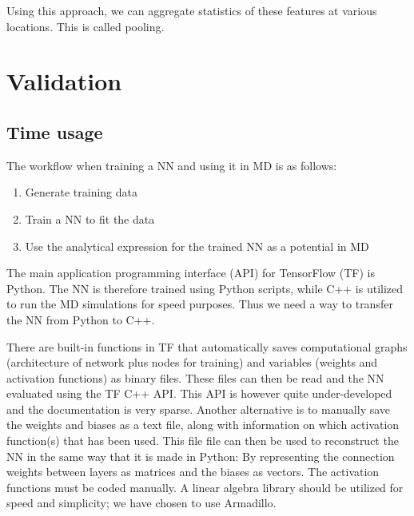\documentclass[twoside,english]{uiofysmaster}
\begin{document}
Using this approach, we can aggregate statistics of these features at various locations. This is called pooling. 

\chapter{Validation}

\section{Time usage} \label{sec:timeUsage}
The workflow when training a NN and using it in MD is as follows: 
\begin{enumerate}
 \item Generate training data
 \item Train a NN to fit the data
 \item Use the analytical expression for the trained NN as a potential in MD
\end{enumerate}
The main application programming interface (API) for TensorFlow (TF) is Python. The NN is therefore
trained using Python scripts, while C++ is utilized to run the MD simulations for speed purposes. Thus
we need a way to transfer the NN from Python to C++. 

There are built-in functions in TF that automatically saves computational graphs (architecture of network plus
nodes for training) and variables (weights and activation functions) as binary files.
These files can then be read and the NN evaluated using the TF C++ API. This API is however quite under-developed
and the documentation is very sparse. Another alternative is to manually save the weights and biases
as a text file, along with information on which activation function(s) that has been used. This file 
file can then be used to reconstruct the NN in the same way that it is made in Python: By representing
the connection weights between layers as matrices and the biases as vectors. The activation functions
must be coded manually. A linear algebra library should
be utilized for speed and simplicity; we have chosen to use Armadillo. 
\end{document}
